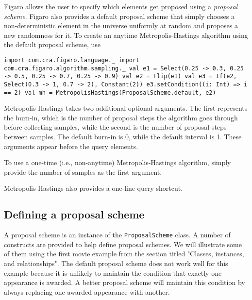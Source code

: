 Figaro allows the user to specify which elements get proposed using a \emph{proposal scheme}. Figaro also provides a default proposal scheme that simply chooses a non-deterministic element in the universe uniformly at random and proposes a new randomness for it. To create an anytime Metropolis-Hastings algorithm using the default proposal scheme, use

\begin{flushleft}
\texttt{import com.cra.figaro.language.\_
\newline import com.cra.figaro.algorithm.sampling.\_
\newline 
\newline val e1 = Select(0.25 -> 0.3, 0.25 -> 0.5, 0.25 -> 0.7, 0.25 -> 0.9)
\newline val e2 = Flip(e1)
\newline val e3 = If(e2, Select(0.3 -> 1, 0.7 -> 2), Constant(2))
\newline e3.setCondition((i: Int) => i == 2)
\newline 
\newline val mh = MetropolisHastings(ProposalScheme.default, e2)
}
\end{flushleft}

Metropolis-Hastings takes two additional optional arguments. The first represents the burn-in, which is the number of proposal steps the algorithm goes through before collecting samples, while the second is the number of proposal steps between samples. The default burn-in is 0, while the default interval is 1. These arguments appear before the query elements.

To use a one-time (i.e., non-anytime) Metropolis-Hastings algorithm, simply provide the number of samples as the first argument.

Metropolis-Hastings also provides a one-line query shortcut.

\subsection{Defining a proposal scheme}

A proposal scheme is an instance of the \texttt{ProposalScheme} class. A number of constructs are provided to help define proposal schemes. We will illustrate some of them using the first movie example from the section titled "Classes, instances, and relationships". The default proposal scheme does not work well for this example because it is unlikely to maintain the condition that exactly one appearance is awarded. A better proposal scheme will maintain this condition by always replacing one awarded appearance with another.

